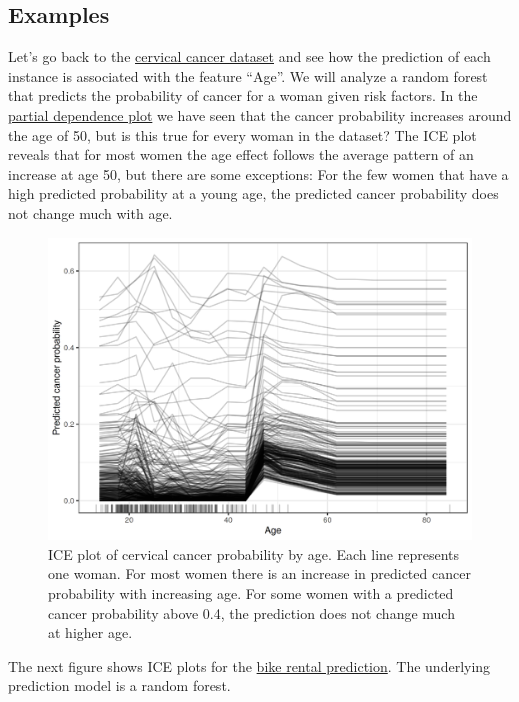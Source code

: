 \documentclass[12pt,]{krantz}
\begin{document}
\subsection{Examples}\label{examples-4}

Let's go back to the \protect\hyperlink{cervical}{cervical cancer
dataset} and see how the prediction of each instance is associated with
the feature ``Age''. We will analyze a random forest that predicts the
probability of cancer for a woman given risk factors. In the
\protect\hyperlink{pdp}{partial dependence plot} we have seen that the
cancer probability increases around the age of 50, but is this true for
every woman in the dataset? The ICE plot reveals that for most women the
age effect follows the average pattern of an increase at age 50, but
there are some exceptions: For the few women that have a high predicted
probability at a young age, the predicted cancer probability does not
change much with age.

\begin{figure}

{\centering \includegraphics[width=\textwidth]{images/ice-cervical-1} 

}

\caption{ICE plot of cervical cancer probability by age. Each line represents one woman. For most women there is an increase in predicted cancer probability with increasing age. For some women with a predicted cancer probability above 0.4, the prediction does not change much at higher age.}\label{fig:ice-cervical}
\end{figure}

The next figure shows ICE plots for the
\protect\hyperlink{bike-data}{bike rental prediction}. The underlying
prediction model is a random forest.
\end{document}

